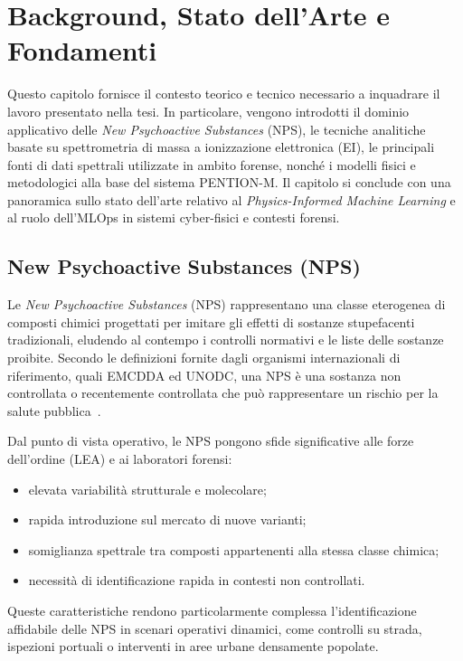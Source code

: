 
\chapter{Background, Stato dell’Arte e Fondamenti}
\label{chap:background}

Questo capitolo fornisce il contesto teorico e tecnico necessario a inquadrare il lavoro presentato nella tesi.
In particolare, vengono introdotti il dominio applicativo delle \emph{New Psychoactive Substances} (NPS), le tecniche analitiche basate su spettrometria di massa a ionizzazione elettronica (EI), le principali fonti di dati spettrali utilizzate in ambito forense, nonché i modelli fisici e metodologici alla base del sistema PENTION-M.
Il capitolo si conclude con una panoramica sullo stato dell’arte relativo al \emph{Physics-Informed Machine Learning} e al ruolo dell’MLOps in sistemi cyber-fisici e contesti forensi.

\section{New Psychoactive Substances (NPS)}
\label{sec:nps}

Le \emph{New Psychoactive Substances} (NPS) rappresentano una classe eterogenea di composti chimici progettati per imitare gli effetti di sostanze stupefacenti tradizionali, eludendo al contempo i controlli normativi e le liste delle sostanze proibite.
Secondo le definizioni fornite dagli organismi internazionali di riferimento, quali EMCDDA ed UNODC, una NPS è una sostanza non controllata o recentemente controllata che può rappresentare un rischio per la salute pubblica~\cite{emcdda_nps, unodc_nps}.

Dal punto di vista operativo, le NPS pongono sfide significative alle forze dell’ordine (LEA) e ai laboratori forensi:
\begin{itemize}
    \item elevata variabilità strutturale e molecolare;
    \item rapida introduzione sul mercato di nuove varianti;
    \item somiglianza spettrale tra composti appartenenti alla stessa classe chimica;
    \item necessità di identificazione rapida in contesti non controllati.
\end{itemize}

Queste caratteristiche rendono particolarmente complessa l’identificazione affidabile delle NPS in scenari operativi dinamici, come controlli su strada, ispezioni portuali o interventi in aree urbane densamente popolate.

